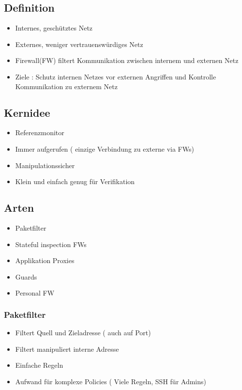 \subsection*{ Definition }
\begin{itemize}
	\item Internes, geschütztes Netz
	\item Externes, weniger vertrauenswürdiges Netz
	\item Firewall(FW) filtert Kommunikation zwischen internem und externen Netz
	\item Ziele : Schutz internen Netzes vor externen Angriffen und Kontrolle Kommunikation zu externem Netz
\end{itemize}

\subsection*{ Kernidee }
\begin{itemize}
	\item Referenzmonitor
	\item Immer aufgerufen ( einzige Verbindung zu externe via FWs)
	\item Manipulationssicher
	\item Klein und einfach genug für Verifikation
\end{itemize}

\subsection*{ Arten }
\begin{itemize}
	\item Paketfilter
	\item Stateful inspection FWs
	\item Applikation Proxies
	\item Guards
	\item Personal FW
\end{itemize}

\subsubsection*{ Paketfilter }
\begin{itemize}
	\item Filtert Quell und Zieladresse ( auch auf Port)
	\item Filtert manipuliert interne Adresse
	\item Einfache Regeln
	\item Aufwand für komplexe Policies ( Viele Regeln, SSH für Admins)
\end{itemize}


